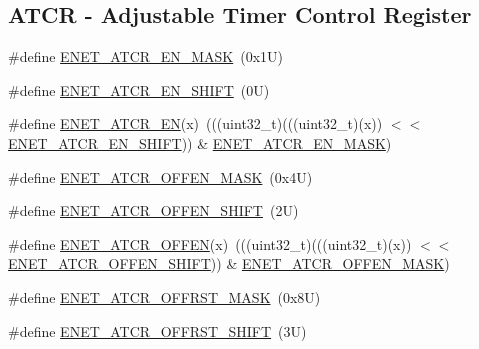 \subsection*{A\+T\+CR -\/ Adjustable Timer Control Register}
\begin{DoxyCompactItemize}
\item 
\#define \mbox{\hyperlink{group___e_n_e_t___register___masks_gad410926040b6756be05d2278d21dea59}{E\+N\+E\+T\+\_\+\+A\+T\+C\+R\+\_\+\+E\+N\+\_\+\+M\+A\+SK}}~(0x1\+U)
\item 
\#define \mbox{\hyperlink{group___e_n_e_t___register___masks_gaf76be9f51320e23fe6b987d73a2b167b}{E\+N\+E\+T\+\_\+\+A\+T\+C\+R\+\_\+\+E\+N\+\_\+\+S\+H\+I\+FT}}~(0\+U)
\item 
\#define \mbox{\hyperlink{group___e_n_e_t___register___masks_ga01d87ff19153d33dfc627d877598e9cf}{E\+N\+E\+T\+\_\+\+A\+T\+C\+R\+\_\+\+EN}}(x)~(((uint32\+\_\+t)(((uint32\+\_\+t)(x)) $<$$<$ \mbox{\hyperlink{group___e_n_e_t___register___masks_gaf76be9f51320e23fe6b987d73a2b167b}{E\+N\+E\+T\+\_\+\+A\+T\+C\+R\+\_\+\+E\+N\+\_\+\+S\+H\+I\+FT}})) \& \mbox{\hyperlink{group___e_n_e_t___register___masks_gad410926040b6756be05d2278d21dea59}{E\+N\+E\+T\+\_\+\+A\+T\+C\+R\+\_\+\+E\+N\+\_\+\+M\+A\+SK}})
\item 
\#define \mbox{\hyperlink{group___e_n_e_t___register___masks_ga101674b5d969a97f418b6e7e60b4814d}{E\+N\+E\+T\+\_\+\+A\+T\+C\+R\+\_\+\+O\+F\+F\+E\+N\+\_\+\+M\+A\+SK}}~(0x4\+U)
\item 
\#define \mbox{\hyperlink{group___e_n_e_t___register___masks_gace9d24d80cada8d29ddfc2d9c97595ba}{E\+N\+E\+T\+\_\+\+A\+T\+C\+R\+\_\+\+O\+F\+F\+E\+N\+\_\+\+S\+H\+I\+FT}}~(2\+U)
\item 
\#define \mbox{\hyperlink{group___e_n_e_t___register___masks_gae45961517c891bea3614e3fe899e3820}{E\+N\+E\+T\+\_\+\+A\+T\+C\+R\+\_\+\+O\+F\+F\+EN}}(x)~(((uint32\+\_\+t)(((uint32\+\_\+t)(x)) $<$$<$ \mbox{\hyperlink{group___e_n_e_t___register___masks_gace9d24d80cada8d29ddfc2d9c97595ba}{E\+N\+E\+T\+\_\+\+A\+T\+C\+R\+\_\+\+O\+F\+F\+E\+N\+\_\+\+S\+H\+I\+FT}})) \& \mbox{\hyperlink{group___e_n_e_t___register___masks_ga101674b5d969a97f418b6e7e60b4814d}{E\+N\+E\+T\+\_\+\+A\+T\+C\+R\+\_\+\+O\+F\+F\+E\+N\+\_\+\+M\+A\+SK}})
\item 
\#define \mbox{\hyperlink{group___e_n_e_t___register___masks_ga95712a56ae929380d83cd69b67781877}{E\+N\+E\+T\+\_\+\+A\+T\+C\+R\+\_\+\+O\+F\+F\+R\+S\+T\+\_\+\+M\+A\+SK}}~(0x8\+U)
\item 
\#define \mbox{\hyperlink{group___e_n_e_t___register___masks_gaeee97384c53d1b0f6cd3780fd1d2f1db}{E\+N\+E\+T\+\_\+\+A\+T\+C\+R\+\_\+\+O\+F\+F\+R\+S\+T\+\_\+\+S\+H\+I\+FT}}~(3\+U)

\end{DoxyCompactItemize}
